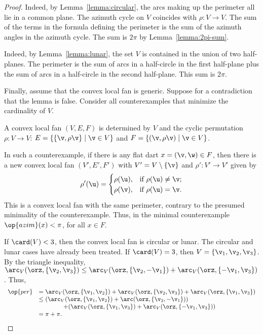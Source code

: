 \begin{proof} 
  Indeed, by Lemma~\ref{lemma:circular},
the arcs making up the perimeter all lie in a common plane.  The
azimuth cycle on $V$ coincides with $\rho:V\to V$.  The sum of the
terms in the formula defining the perimeter is the sum of the
azimuth angles in the azimuth cycle.  The sum is $2\pi$ by
Lemma~\ref{lemma:2pi-sum}.


  Indeed, by Lemma~\ref{lemma:lunar}, the
set $V$ is contained in the union of two half-planes.  The perimeter
is the sum of arcs in a half-circle in the first half-plane plus the
sum of arcs in a half-circle in the second half-plane. This sum is
$2\pi$.

Finally, assume that the convex local fan is generic.  Suppose for a
contradiction that the lemma is false.  Consider all counterexamples
that minimize the cardinality of $V$.  

A convex local fan $(V,E,F)$ is determined by $V$ and the cyclic
permutation $\rho:V\to V$: $E=\{\{\v,\rho \v\}\mid \v\in V\}$ and $F
= \{(\v,\rho \v)\mid \v\in V\}$.

In such a counterexample, if there is any flat dart $x=(\v,\w)\in F$,
then there is a new convex local fan $(V',E',F')$ with $V' =
V\setminus\{\v\}$ and $\rho':V'\to V'$ given by
\begin{displaymath}
\rho'(\u) = \begin{cases}
\rho(\u), & \text{if } \rho(\u)\ne \v;\\
\rho(\v), & \text{if }\rho(\u) = \v.\\
\end{cases}
\end{displaymath}
This is a convex local fan with the same perimeter, contrary to the presumed
minimality of the counterexample.  Thus, in the minimal counterexample
$\op{azim}(x) <\pi$, for all $x\in F$.

If $\card(V) <3$, then the convex local fan is circular or lunar.  The
circular and lunar cases have 
already been treated.  If $\card(V)=3$, then $V=\{\v_1,\v_2,\v_3\}$.
By the triangle inequality, $\arc_V(\orz,\{\v_2,\v_3\}) \le
\arc_V(\orz,\{\v_2,-\v_1\})+\arc_V(\orz,\{-\v_1,\v_3\})$.  Thus,
\begin{displaymath}
\begin{array}{rll}
  \op{per} &=\arc_V(\orz,\{\v_1,\v_2\}) 
  + \arc_V(\orz,\{\v_2,\v_3\}) 
  + \arc_V(\orz,\{\v_1,\v_3\})\\
  &\le(\arc_V(\orz,\{\v_1,\v_2\})+\arc(\orz,\{\v_2,-\v_1\}))
  \\&\qquad\qquad+(\arc_V(\orz,\{\v_1,\v_3\})
+\arc_V(\orz,\{-\v_1,\v_3\})) \\
  &= \pi+\pi.
\end{array}
\end{displaymath}


\end{proof}

